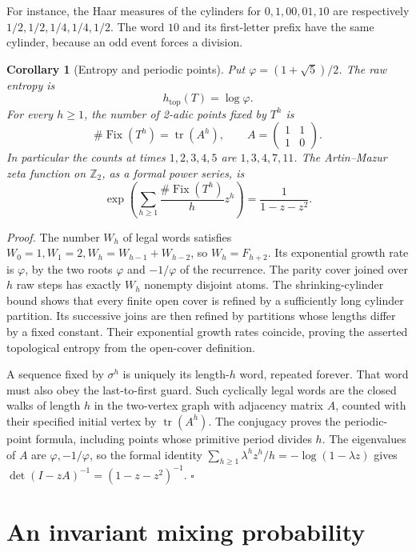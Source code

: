 \documentclass[11pt,letterpaper]{article}
\newcommand{\Z}{\mathbb{Z}}
\newtheorem{corollary}[theorem]{Corollary}
\newenvironment{proof}{\noindent\textit{Proof.}}{\hfill\(\square\)}
\begin{document}
For instance, the Haar measures of the cylinders for
\(0,1,00,01,10\) are respectively \(1/2,1/2,1/4,1/4,1/2\).
The word \(10\) and its first-letter
prefix have the same cylinder, because an odd event forces a division.

\begin{corollary}[Entropy and periodic points]
\label{cor:entropy}
Put \(\varphi=(1+\sqrt5)/2\). The raw entropy is
\[
h_{\mathrm{top}}(T)=\log\varphi.
\]
For every \(h\ge1\), the number of 2-adic points fixed by \(T^h\) is
\[
\#\operatorname{Fix}(T^h)=\operatorname{tr}(A^h),\qquad
A=\begin{pmatrix}1&1\\1&0\end{pmatrix}.
\]
In particular the counts at times \(1,2,3,4,5\) are \(1,3,4,7,11\).
The Artin--Mazur zeta function on \(\Z_2\), as a formal power series, is
\[
\exp\left(\sum_{h\ge1}\frac{\#\operatorname{Fix}(T^h)}h z^h\right)
=\frac1{1-z-z^2}.
\]
\end{corollary}

\begin{proof}
The number \(W_h\) of legal words satisfies
\(W_0=1,W_1=2,W_h=W_{h-1}+W_{h-2}\), so \(W_h=F_{h+2}\).
Its exponential growth rate is \(\varphi\), by the two roots
\(\varphi\) and \(-1/\varphi\) of the recurrence.
The parity cover joined over \(h\) raw steps has exactly \(W_h\)
nonempty disjoint atoms. The shrinking-cylinder bound shows that every
finite open cover is refined by a sufficiently long cylinder partition.
Its successive joins are then refined by partitions whose lengths
differ by a fixed constant. Their exponential growth rates coincide,
proving the asserted topological entropy from the open-cover definition.

A sequence fixed by \(\sigma^h\) is uniquely its length-\(h\) word,
repeated forever. That word must also obey the last-to-first guard.
Such cyclically legal words are the closed walks of length \(h\)
in the two-vertex graph with adjacency matrix \(A\), counted with
their specified initial vertex by \(\operatorname{tr}(A^h)\).
The conjugacy proves the periodic-point formula, including points
whose primitive period divides \(h\). The eigenvalues of \(A\)
are \(\varphi,-1/\varphi\), so the formal identity
\(\sum_{h\ge1}\lambda^h z^h/h=-\log(1-\lambda z)\) gives
\(\det(I-zA)^{-1}=(1-z-z^2)^{-1}\).
\end{proof}

\section{An invariant mixing probability}
\end{document}
